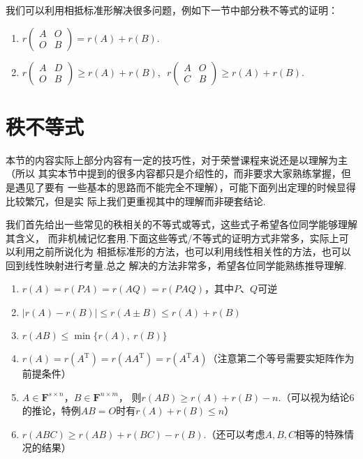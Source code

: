我们可以利用相抵标准形解决很多问题，例如下一节中部分秩不等式的证明：
\begin{example}
    \begin{enumerate}
        \item $r\begin{pmatrix}
            A & O \\ O & B
        \end{pmatrix}=r(A)+r(B)$.

        \item $r\begin{pmatrix}
            A & D \\ O & B
        \end{pmatrix}\geqslant r(A)+r(B),\enspace r\begin{pmatrix}
            A & O \\ C & B
        \end{pmatrix}\geqslant r(A)+r(B)$.
    \end{enumerate}
\end{example}

\section{秩不等式}
本节的内容实际上部分内容有一定的技巧性，对于荣誉课程来说还是以理解为主（所以
其实本节中提到的很多内容都只是介绍性的，而非要求大家熟练掌握，但是遇见了要有
一些基本的思路而不能完全不理解），可能下面列出定理的时候显得比较繁冗，但是实
际上我们更重视其中的理解而非硬套结论.

我们首先给出一些常见的秩相关的不等式或等式，这些式子希望各位同学能够理解其含义，
而非机械记忆套用.下面这些等式/不等式的证明方式非常多，实际上可以利用之前所说化为
相抵标准形的方法，也可以利用线性相关性的方法，也可以回到线性映射进行考量.总之
解决的方法非常多，希望各位同学能熟练推导理解.
\begin{enumerate}
    \item $r(A)=r(PA)=r(AQ)=r(PAQ)$，其中$P$、$Q$可逆
    \item $|r(A)-r(B)|\leqslant r(A\pm B) \leqslant r(A)+r(B)$
    \item $r(AB) \leqslant \min\{r(A),\ r(B)\}$
    \item $r(A)=r(A^\mathrm{T})=r(AA^\mathrm{T})=r(A^\mathrm{T}A)$（注意第二个等号需要实矩阵作为前提条件）
    \item $A \in \mathbf{F}^{s \times n}$，$B \in \mathbf{F}^{n \times m}$，
    则$r(AB) \geqslant r(A)+r(B)-n$.（可以视为结论6的推论，特例$AB=O$时有$r(A)+r(B)\leqslant n$）
    \item $r(ABC) \geqslant r(AB)+r(BC)-r(B)$.（还可以考虑$A,B,C$相等的特殊情况的结果）
\end{enumerate}

